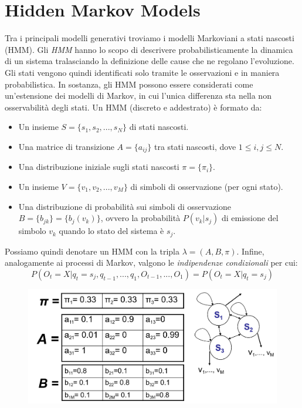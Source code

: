 \documentclass[a4paper,oneside,titlepage]{book}
\begin{document}
\section{Hidden Markov Models}
Tra i principali modelli generativi troviamo i modelli Markoviani a stati nascosti (HMM). Gli \textit{HMM} hanno lo scopo di descrivere probabilisticamente la dinamica di un sistema tralasciando la definizione delle cause che ne regolano l'evoluzione. Gli stati vengono quindi identificati solo tramite le osservazioni e in maniera probabilistica. In sostanza, gli HMM possono essere considerati come un'estensione dei modelli di Markov, in cui l'unica differenza sta nella non osservabilità degli stati. Un HMM (discreto e addestrato) è formato da:
\begin{itemize}
    \item Un insieme $S  = \{ s_1, s_2, ..., s_N \}$ di stati nascosti.
    \item Una matrice di transizione $A = \{ a_{ij} \}$ tra stati nascosti, dove $1 \leq i,j \leq N$.
    \item Una distribuzione iniziale sugli stati nascosti $\pi = \{ \pi_i \}$.
    \item Un insieme $V = \{ v_1, v_2, ..., v_M \}$ di simboli di osservazione (per ogni stato).
    \item Una distribuzione di probabilità sui simboli di osservazione $B = \{ b_{jk} \} = \{ b_j(v_k) \}$, ovvero la probabilità $P(v_k|s_j)$ di emissione del simbolo $v_k$ quando lo stato del sistema è $s_j$.
\end{itemize}
Possiamo quindi denotare un HMM con la tripla $\lambda=(A,B,\pi)$. Infine, analogamente ai processi di Markov, valgono le \textit{indipendenze condizionali} per cui:
\[ P(O_t=X | q_t=s_j, q_{t-1}, ..., q_1, O_{t-1}, ..., O_1) = P(O_t=X | q_t=s_j) \]
\begin{figure}[htp]
	\centering
	\includegraphics[width=\textwidth, height=\textheight, keepaspectratio]{hmm1.png}
\end{figure}
\end{document}

